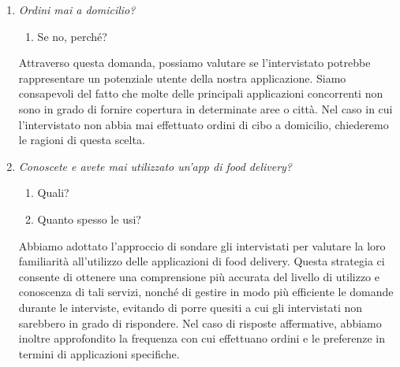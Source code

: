 \documentclass{article}
\begin{document}
\begin{enumerate}
    \item \textit{Ordini mai a domicilio?}
        \begin{enumerate}
            \item Se no, perché?
        \end{enumerate}
        \begin{tcolorbox}[
            colframe=green,  %
            colback=white,  %
            sharp corners,  %
            boxrule=0.5pt,  %
            left=5pt,  %
            right=5pt,  %
            top=5pt,  %
            bottom=5pt  %
        ]
        Attraverso questa domanda, possiamo valutare se l'intervistato potrebbe rappresentare un potenziale utente della nostra applicazione. Siamo consapevoli del fatto che molte delle principali applicazioni concorrenti non sono in grado di fornire copertura in determinate aree o città. Nel caso in cui l'intervistato non abbia mai effettuato ordini di cibo a domicilio, chiederemo le ragioni di questa scelta.
        \end{tcolorbox}
    \newpage
    \item \textit{Conoscete e avete mai utilizzato un'app di food delivery?}
        \begin{enumerate}
            \item Quali?
            \item Quanto spesso le usi?
        \end{enumerate}
        \begin{tcolorbox}[
            colframe=green,  %
            colback=white,  %
            sharp corners,  %
            boxrule=0.5pt,  %
            left=5pt,  %
            right=5pt,  %
            top=5pt,  %
            bottom=5pt  %
        ]
        Abbiamo adottato l'approccio di sondare gli intervistati per valutare la loro familiarità all'utilizzo delle applicazioni di food delivery. Questa strategia ci consente di ottenere una comprensione più accurata del livello di utilizzo e conoscenza di tali servizi, nonché di gestire in modo più efficiente le domande durante le interviste, evitando di porre quesiti a cui gli intervistati non sarebbero in grado di rispondere. Nel caso di risposte affermative, abbiamo inoltre approfondito la frequenza con cui effettuano ordini e le preferenze in termini di applicazioni specifiche.

\end{tcolorbox}
\end{enumerate}
\end{document}
